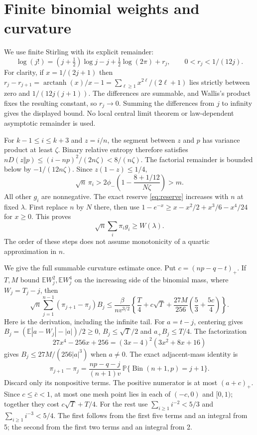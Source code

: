 \documentclass[11pt]{article}
\newcommand{\E}{\mathbb E}\newcommand{\Pp}{\mathbb P}
\begin{document}
\section{Finite binomial weights and curvature}

We use finite Stirling with its explicit remainder:
\[
\log(j!)=(j+\tfrac12)\log j-j+\tfrac12\log(2\pi)+r_j,\qquad
0<r_j<1/(12j).
\]
For clarity, if $x=1/(2j+1)$ then
$r_j-r_{j+1}=\operatorname{arctanh}(x)/x-1
=\sum_{\ell\ge1}x^{2\ell}/(2\ell+1)$ lies strictly between
zero and $1/(12j(j+1))$. The differences are summable, and Wallis's
product fixes the resulting constant, so $r_j\to0$. Summing the
differences from $j$ to infinity gives the displayed bound. No local central limit theorem
or law-dependent asymptotic remainder is used.

For $k-1\le i\le k+3$ and $z=i/n$, the segment between $z$ and $p$
has variance product at least $\zeta$. Binary relative entropy therefore
satisfies $nD(z\Vert p)\le(i-np)^2/(2n\zeta)<8/(n\zeta)$.
The factorial remainder is bounded below by $-1/(12n\zeta)$.
Since $z(1-z)\le1/4$,
\[
\sqrt n\,\pi_i>
2\phi_-\left(1-\frac{8+1/12}{N\zeta}\right)>m.
\]
All other $g_i$ are nonnegative. The exact reserve \eqref{eq:reserve}
increases with $n$ at fixed $\lambda$. First replace $n$ by $N$ there,
then use
$1-e^{-x}\ge x-x^2/2+x^3/6-x^4/24$ for $x\ge0$.
This proves
\begin{equation}\label{eq:weighted}\sqrt n\sum_i\pi_i g_i\ge W(\lambda).\end{equation}
The order of these steps does not assume monotonicity of a quartic
approximation in $n$.

We give the full summable curvature estimate once. Put
$c=(np-q-t)_+$. If $T,M$ bound $\E W_j^2,\E W_j^4$ on the increasing
side of the binomial mass, where $W_j=T_j-j$, then
\begin{equation}\label{eq:curvature}
\sqrt n\sum_{j=1}^{n-1}(\pi_{j+1}-\pi_j)B_j
\le\frac{\beta}{nv^{3/2}}
\left\{\frac T4+c\sqrt T+\frac{27M}{256}
\left(\frac53+\frac{5c}4\right)\right\}.
\end{equation}
Here is the derivation, including the infinite tail.
For $a=t-j$, centering gives
$B_j=(\E|a-W_j|-|a|)/2\ge0$,
$B_j\le\sqrt T/2$ and $a_+B_j\le T/4$.
The factorization
\[
27x^4-256x+256=(3x-4)^2(3x^2+8x+16)
\]
gives $B_j\le27M/(256|a|^3)$ when $a\ne0$.
The exact adjacent-mass identity is
\[
\pi_{j+1}-\pi_j
=\frac{np-q-j}{(n+1)v}\,
\Pp\{\operatorname{Bin}(n+1,p)=j+1\}.
\]
Discard only its nonpositive terms. The positive numerator is at most
$(a+c)_+$. Since $c\le\bar c<1$, at most one mesh point lies in each of
$(-c,0)$ and $[0,1)$; together they cost $c\sqrt T+T/4$.
For the rest use
$\sum_{i\ge1}i^{-2}<5/3$ and $\sum_{i\ge1}i^{-3}<5/4$.
The first follows from the first five terms and an integral from 5;
the second from the first two terms and an integral from 2.
\end{document}
